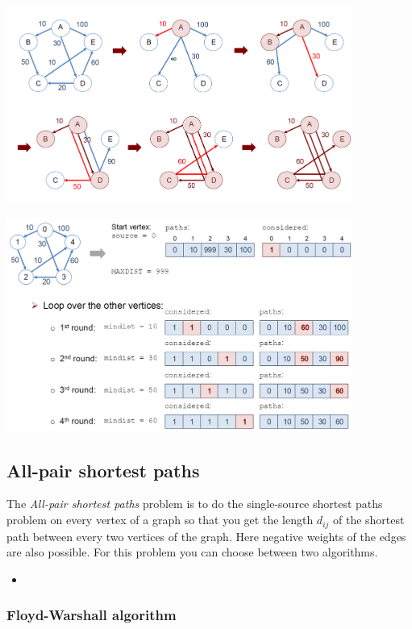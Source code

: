 \begin{center}
    \includegraphics[width=0.85\textwidth]{img/graphs/DijkstraGraph.png}
\end{center}

\begin{center}
    \includegraphics[width=0.85\textwidth]{img/graphs/DijkstraVectorGraph.png}
\end{center}

%

\subsection{All-pair shortest paths}

The \emph{All-pair shortest paths} problem is to do the single-source shortest paths problem on every vertex of a graph so that you get the length $d_{ij}$ of the shortest path between every two vertices of the graph. Here negative weights of the edges are also possible. For this problem you can choose between two algorithms.
\begin{itemize}
    \item 
\end{itemize}

\subsubsection{Floyd-Warshall algorithm}